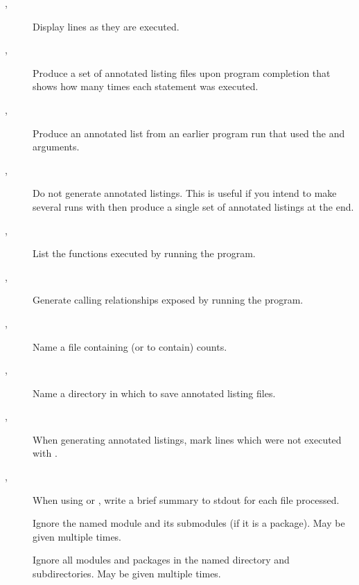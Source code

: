 \begin{description}
\item[, ]
Display lines as they are executed.

\item[, ]
Produce a set of  annotated listing files upon program
completion that shows how many times each statement was executed.

\item[, ]
Produce an annotated list from an earlier program run that
used the  and  arguments.

\item[, ]
Do not generate annotated listings.  This is useful if you intend to make
several runs with  then produce a single set
of annotated listings at the end.

\item[, ]
List the functions executed by running the program.

\item[, ]
Generate calling relationships exposed by running the program.

\item[, ]
Name a file containing (or to contain) counts.

\item[, ]
Name a directory in which to save annotated listing files.

\item[, ]
When generating annotated listings, mark lines which
were not executed with \code{>}\code{>}\code{>}\code{>}\code{>}\code{>}.

\item[, ]
When using  or , write a
brief summary to stdout for each file processed.

\item[]
Ignore the named module and its submodules (if it is
a package).  May be given multiple times.

\item[]
Ignore all modules and packages in the named directory
and subdirectories.  May be given multiple times.
\end{description}

